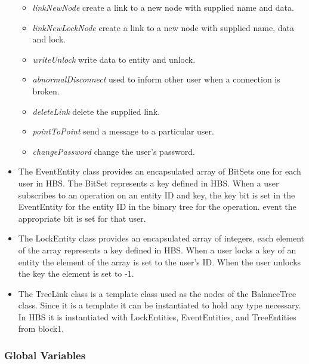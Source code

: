\begin{itemize}
\begin {itemize}
    data and lock. 
    \item {\em linkNewNode} create a link to a new node with supplied name
    and data.
    \item {\em linkNewLockNode} create a link to a new node with supplied
    name, data and lock.
    \item {\em writeUnlock} write data to entity and unlock.
    \item {\em abnormalDisconnect} used to inform other user when a
    connection is broken.
    \item {\em deleteLink} delete the supplied link.
    \item {\em pointToPoint} send a message to a particular user.
    \item {\em changePassword} change the user's password.
\end{itemize}

\item The EventEntity class provides an encapsulated array of BitSets one
  for each user in HBS.  The BitSet represents a key defined in HBS.
  When a user subscribes to an operation on an entity ID and key, the key
  bit is set in the EventEntity for the entity ID in the binary tree for
  the operation. event the appropriate bit is set for that user.

%

  
\item The LockEntity class provides an encapsulated array of integers,
  each element of the array represents a key defined in HBS.  When a user
  locks a key of an entity the element of the array is set to the user's
  ID.  When the user unlocks the key the element is set to -1.

\item The TreeLink class is a template class used as the nodes of the
  BalanceTree class.  Since it is a template it can be instantiated to hold
  any type necessary.  In HBS it is instantiated with LockEntities,
  EventEntities, and TreeEntities from block1.

\end{itemize}

\subsubsection*{Global Variables}

